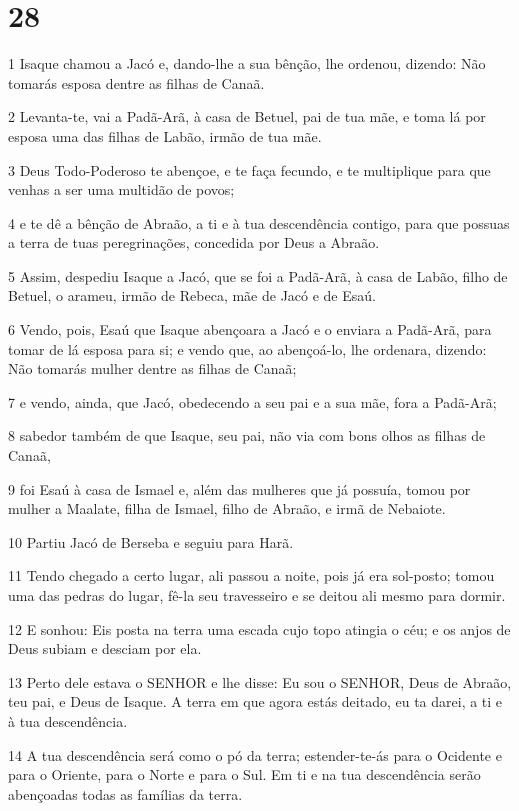 \chapter{28}

\par 1 Isaque chamou a Jacó e, dando-lhe a sua bênção, lhe ordenou, dizendo: Não tomarás esposa dentre as filhas de Canaã.
\par 2 Levanta-te, vai a Padã-Arã, à casa de Betuel, pai de tua mãe, e toma lá por esposa uma das filhas de Labão, irmão de tua mãe.
\par 3 Deus Todo-Poderoso te abençoe, e te faça fecundo, e te multiplique para que venhas a ser uma multidão de povos;
\par 4 e te dê a bênção de Abraão, a ti e à tua descendência contigo, para que possuas a terra de tuas peregrinações, concedida por Deus a Abraão.
\par 5 Assim, despediu Isaque a Jacó, que se foi a Padã-Arã, à casa de Labão, filho de Betuel, o arameu, irmão de Rebeca, mãe de Jacó e de Esaú.
\par 6 Vendo, pois, Esaú que Isaque abençoara a Jacó e o enviara a Padã-Arã, para tomar de lá esposa para si; e vendo que, ao abençoá-lo, lhe ordenara, dizendo: Não tomarás mulher dentre as filhas de Canaã;
\par 7 e vendo, ainda, que Jacó, obedecendo a seu pai e a sua mãe, fora a Padã-Arã;
\par 8 sabedor também de que Isaque, seu pai, não via com bons olhos as filhas de Canaã,
\par 9 foi Esaú à casa de Ismael e, além das mulheres que já possuía, tomou por mulher a Maalate, filha de Ismael, filho de Abraão, e irmã de Nebaiote.
\par 10 Partiu Jacó de Berseba e seguiu para Harã.
\par 11 Tendo chegado a certo lugar, ali passou a noite, pois já era sol-posto; tomou uma das pedras do lugar, fê-la seu travesseiro e se deitou ali mesmo para dormir.
\par 12 E sonhou: Eis posta na terra uma escada cujo topo atingia o céu; e os anjos de Deus subiam e desciam por ela.
\par 13 Perto dele estava o SENHOR e lhe disse: Eu sou o SENHOR, Deus de Abraão, teu pai, e Deus de Isaque. A terra em que agora estás deitado, eu ta darei, a ti e à tua descendência.
\par 14 A tua descendência será como o pó da terra; estender-te-ás para o Ocidente e para o Oriente, para o Norte e para o Sul. Em ti e na tua descendência serão abençoadas todas as famílias da terra.
